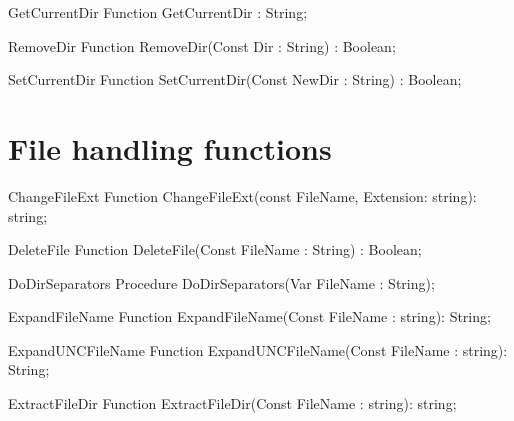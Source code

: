  
\begin{function}{GetCurrentDir}
\Declaration
Function GetCurrentDir : String;
\Description
\Errors
\SeeAlso
\end{function}

 
\begin{function}{RemoveDir}
\Declaration
Function RemoveDir(Const Dir : String) : Boolean;
\Description
\Errors
\SeeAlso
\end{function}

 
\begin{function}{SetCurrentDir}
\Declaration
Function SetCurrentDir(Const NewDir : String) : Boolean;
\Description
\Errors
\SeeAlso
\end{function}

 


\section{File handling functions}

      
  
\begin{function}{ChangeFileExt}
\Declaration
Function ChangeFileExt(const FileName, Extension: string): string;
\Description
\Errors
\SeeAlso
\end{function}

 
\begin{function}{DeleteFile}
\Declaration
Function DeleteFile(Const FileName : String) : Boolean;
\Description
\Errors
\SeeAlso
\end{function}

 
\begin{procedure}{DoDirSeparators}
\Declaration
Procedure DoDirSeparators(Var FileName : String);
\Description
\Errors
\SeeAlso
\end{procedure}

 
\begin{function}{ExpandFileName}
\Declaration
Function ExpandFileName(Const FileName : string): String;
\Description
\Errors
\SeeAlso
\end{function}

 
\begin{function}{ExpandUNCFileName}
\Declaration
Function ExpandUNCFileName(Const FileName : string): String;
\Description
\Errors
\SeeAlso
\end{function}

 
\begin{function}{ExtractFileDir}
\Declaration
Function ExtractFileDir(Const FileName : string): string;
\Description
\Errors
\SeeAlso
\end{function}

